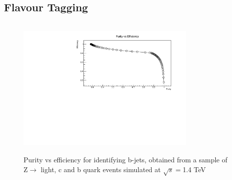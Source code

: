 \subsection{Flavour Tagging}
\label{Flavour Tagging}

\begin{figure}[t]
  \centering
  \includegraphics[width=0.78\textwidth,height=7cm,keepaspectratio]{figures/btag_crosses}
  \caption[B-Tagging Purity vs Efficiency]{Purity vs efficiency for identifying b-jets, obtained from a sample of Z$\rightarrow$ light, c and b quark events simulated at $\sqrt{s}=$1.4 TeV}
  \label{fig:Zbtagging}
\end{figure}


